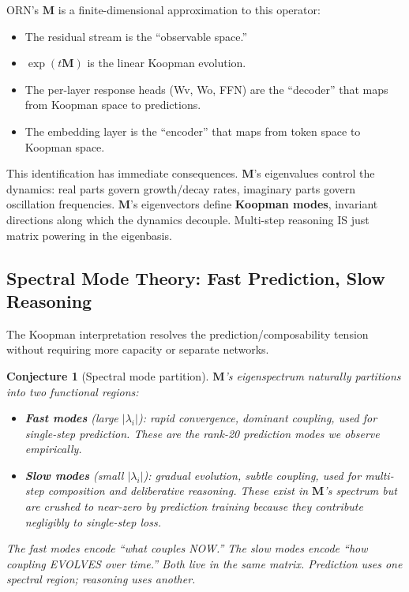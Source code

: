 \documentclass[11pt, a4paper]{article}
\newcommand{\M}{\mathbf{M}}
\theoremstyle{plain}
\newtheorem{conjecture}{Conjecture}
\theoremstyle{remark}
\begin{document}
ORN's $\M$ is a finite-dimensional approximation to this operator:
\begin{itemize}[nosep]
    \item The residual stream is the ``observable space.''
    \item $\exp(t\M)$ is the linear Koopman evolution.
    \item The per-layer response heads (Wv, Wo, FFN) are the ``decoder'' that maps from Koopman space to predictions.
    \item The embedding layer is the ``encoder'' that maps from token space to Koopman space.
\end{itemize}

This identification has immediate consequences.
$\M$'s eigenvalues control the dynamics: real parts govern growth/decay rates, imaginary parts govern oscillation frequencies.
$\M$'s eigenvectors define \textbf{Koopman modes}, invariant directions along which the dynamics decouple.
Multi-step reasoning IS just matrix powering in the eigenbasis.

\subsection{Spectral Mode Theory: Fast Prediction, Slow Reasoning}

The Koopman interpretation resolves the prediction/composability tension without requiring more capacity or separate networks.

\begin{conjecture}[Spectral mode partition]
$\M$'s eigenspectrum naturally partitions into two functional regions:
\begin{itemize}[nosep]
    \item \textbf{Fast modes} (large $|\lambda_i|$): rapid convergence, dominant coupling, used for single-step prediction.  These are the rank-20 prediction modes we observe empirically.
    \item \textbf{Slow modes} (small $|\lambda_i|$): gradual evolution, subtle coupling, used for multi-step composition and deliberative reasoning.  These exist in $\M$'s spectrum but are crushed to near-zero by prediction training because they contribute negligibly to single-step loss.
\end{itemize}
The fast modes encode ``what couples NOW.''
The slow modes encode ``how coupling EVOLVES over time.''
Both live in the same matrix.
Prediction uses one spectral region; reasoning uses another.
\end{conjecture}
\end{document}
